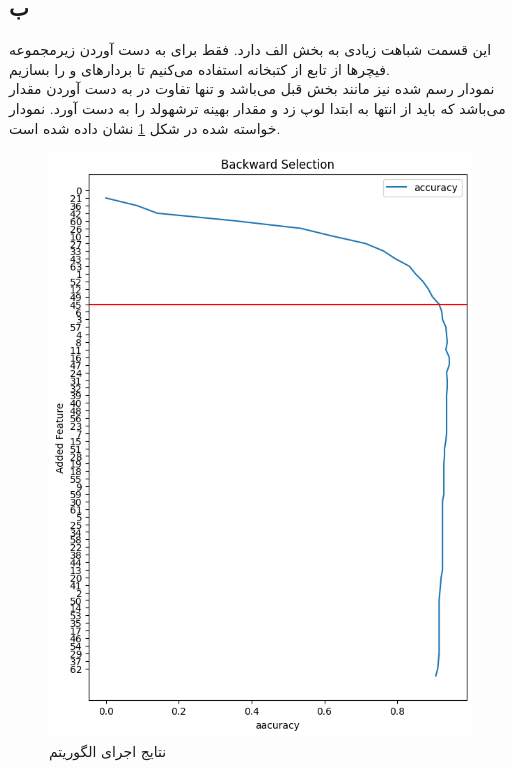 \documentclass[12pt,onecolumn,a4paper]{article}
\begin{document}
\subsection*{ب}
این قسمت شباهت زیادی به بخش الف دارد. فقط برای به دست آوردن زیرمجموعه فیچرها از تابع  از کتبخانه  استفاده می‌کنیم تا بردارهای  و  را بسازیم. 
\\
نمودار رسم شده نیز مانند بخش قبل می‌باشد و تنها تفاوت در به دست آوردن مقدار  می‌باشد که باید از انتها به ابتدا لوپ زد و مقدار بهینه ترشهولد را به دست آورد. نمودار خواسته شده در شکل \ref{fig:2} نشان داده شده است.
\begin{figure}[h!]
    \begin{center}
    \includegraphics[scale=0.55]{plots/q6_b.png}
    \caption{نتایج اجرای الگوریتم }
    \label{fig:2}
    \end{center}
\end{figure}
\end{document}
